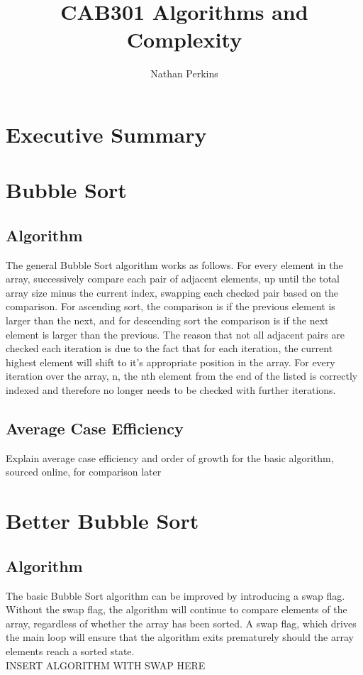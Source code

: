 \documentclass[]{article}
\title{CAB301 Algorithms and Complexity}
\author{Nathan Perkins}
\begin{document}
\maketitle
\tableofcontents
\newpage
\section{Executive Summary}
\section{Bubble Sort}
\subsection{Algorithm}
The general Bubble Sort algorithm works as follows. For every element in the array, successively compare each pair of adjacent elements, up until the total array size minus the current index, swapping each checked pair based on the comparison. For ascending sort, the comparison is if the previous element is larger than the next, and for descending sort the comparison is if the next element is larger than the previous. The reason that not all adjacent pairs are checked each iteration is due to the fact that for each iteration, the current highest element will shift to it's appropriate position in the array. For every iteration over the array, n, the nth element from the end of the listed is correctly indexed and therefore no longer needs to be checked with further iterations.
\subsection{Average Case Efficiency}
Explain average case efficiency and order of growth for the basic algorithm, sourced online, for comparison later
\section{Better Bubble Sort}
\subsection{Algorithm}
The basic Bubble Sort algorithm can be improved by introducing a swap flag. Without the swap flag, the algorithm will continue to compare elements of the array, regardless of whether the array has been sorted. A swap flag, which drives the main loop will ensure that the algorithm exits prematurely should the array elements reach a sorted state. 
\\
INSERT ALGORITHM WITH SWAP HERE
\\
\end{document}

